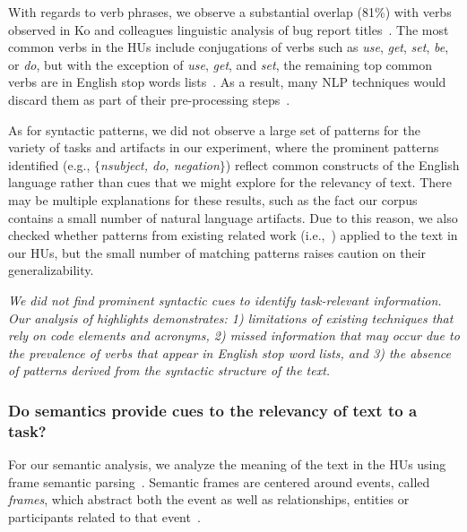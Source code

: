 With regards to verb phrases, we observe a substantial
overlap (81\%) with verbs observed in Ko and colleagues linguistic analysis
of bug report titles~\cite{Ko2006}.
The most common verbs in the HUs include conjugations of verbs such as \textit{use}, \textit{get}, \textit{set}, \textit{be}, or \textit{do},
but with the exception of \textit{use}, \textit{get}, and \textit{set}, the
remaining top common verbs are in English stop words lists~\cite{jurafsky2014speech}. As a result, many
\acs{NLP} techniques would discard them as part of their pre-processing
steps~\cite{Bavota2016}.






As for syntactic patterns, we did not observe a large set of patterns for the variety of tasks and artifacts in our experiment,
where the prominent patterns identified (e.g., $\{$\textit{nsubject, do, negation}$\}$)
reflect common constructs of the English language rather than cues that we might explore for the relevancy of text.
There may be multiple explanations for these results, such as
the fact our corpus contains a small number of natural language artifacts.
Due to this reason, we also checked whether patterns from existing related work (i.e.,~\cite{Chaparro2017, Robillard2015}) applied to the text in our HUs, 
but the small number of matching patterns 
raises caution on
their generalizability.



\medskip
\begin{bluequote}
    \textit{We did not find prominent syntactic cues to identify
    task-relevant information. Our analysis of highlights demonstrates:
    1) limitations of existing techniques that rely on code
    elements and acronyms, 2) missed
    information that may occur due to the prevalence of verbs that
    appear in English stop word lists,
    and 3) the absence of patterns derived from the syntactic structure of
    the text.}
\end{bluequote}

 



\subsubsection{Do semantics provide cues to the relevancy of text to a task?}
\label{cp3:semantic-analysis}


For our semantic analysis, we
analyze the meaning of the text in the 
 HUs
using frame semantic parsing~\cite{fillmore1976frame, jurafsky2014speech}.
Semantic frames are centered around events, called \textit{frames}, 
which abstract both the event
as well as relationships, entities or participants related to that
event~\cite{fillmore1976frame, Baker1998}. 


